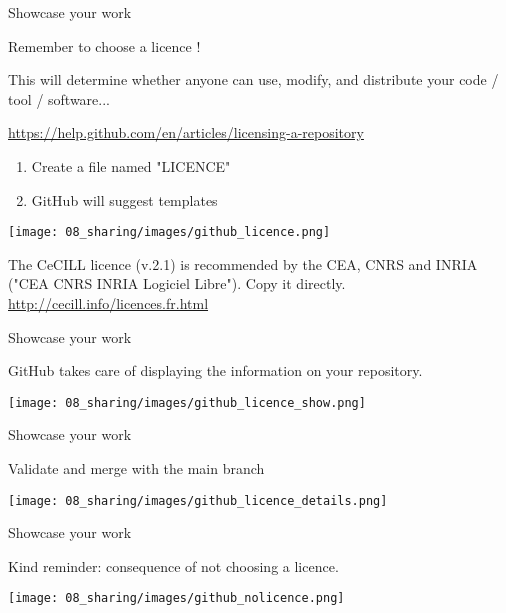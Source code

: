 \begin{frame}{Showcase your work}

Remember to choose a licence !

This will determine whether anyone can use, modify, and distribute your code / tool / software...

\begin{center}
\url{https://help.github.com/en/articles/licensing-a-repository}
\end{center}

\begin{enumerate}
    \item Create a file named "LICENCE"
    \item GitHub will suggest templates
\end{enumerate}

\begin{center}
    \texttt{[image: 08\_sharing/images/github\_licence.png]}
\end{center}

The CeCILL licence (v.2.1) is recommended by the CEA, CNRS and INRIA ("CEA CNRS INRIA Logiciel Libre"). Copy it directly. 
\url{http://cecill.info/licences.fr.html}
\end{frame}

\begin{frame}{Showcase your work}

GitHub takes care of displaying the information on your repository.

\begin{center}
    \texttt{[image: 08\_sharing/images/github\_licence\_show.png]}
\end{center}

\end{frame}

\begin{frame}{Showcase your work}

Validate and merge with the main branch

\begin{center}
    \texttt{[image: 08\_sharing/images/github\_licence\_details.png]}
\end{center}

\end{frame}

\begin{frame}{Showcase your work}

Kind reminder: consequence of not choosing a licence.

\begin{center}
    \texttt{[image: 08\_sharing/images/github\_nolicence.png]}
\end{center}

\end{frame}

